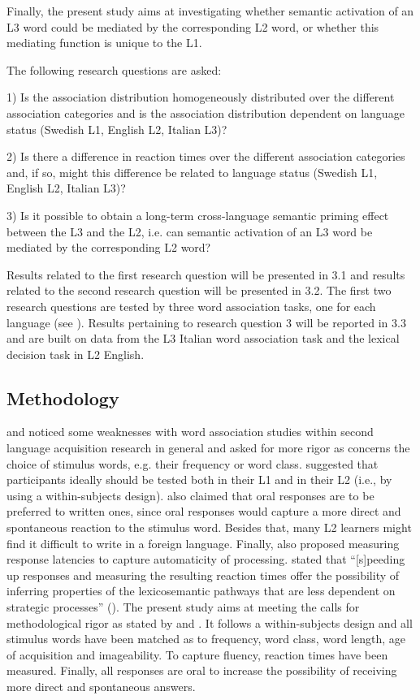 \documentclass[output=paper,colorlinks,citecolor=brown,nonflat]{langsci/langscibook}
\begin{document}
Finally, the present study aims at investigating whether semantic activation of an L3 word could be mediated by the corresponding L2 word, or whether this mediating function is unique to the L1.

The following research questions are asked:

1) Is the association distribution homogeneously distributed over the different association categories and is the association distribution dependent on language status (Swedish L1, English L2, Italian L3)?

2) Is there a difference in reaction times over the different association categories and, if so, might this difference be related to language status (Swedish L1, English L2, Italian L3)?

3) Is it possible to obtain a long-term cross-language semantic priming effect between the L3 and the L2, i.e. can semantic activation of an L3 word be mediated by the corresponding L2 word?

Results related to the first research question will be presented in 3.1 and results related to the second research question will be presented in 3.2. The first two research questions are tested by three word association tasks, one for each language (see ). Results pertaining to research question 3 will be reported in 3.3 and are built on data from the L3 Italian word association task and the lexical decision task in L2 English.

\subsection{Methodology}\label{sec:gudmundson:2.2}

\citet{Fitzpatrick2006} and \citet{FitzpatrickEtAl2013} noticed some weaknesses with word association studies within second language acquisition research in general and asked for more rigor as concerns the choice of stimulus words, e.g. their frequency or word class. \citet[200]{CremerEtAl2010} suggested that participants ideally should be tested both in their L1 and in their L2 (i.e., by using a within-subjects design). \citeauthor{CremerEtAl2010} also claimed that oral responses are to be preferred to written ones, since oral responses would capture a more direct and spontaneous reaction to the stimulus word. Besides that, many L2 learners might find it difficult to write in a foreign language. Finally, \citeauthor{CremerEtAl2010} also proposed measuring response latencies to capture automaticity of processing. \citeauthor{FitzpatrickIzura2011} stated that “[s]peeding up responses and measuring the resulting reaction times offer the possibility of inferring properties of the lexicosemantic pathways that are less dependent on strategic processes” (\citeyear[376]{FitzpatrickIzura2011}). The present study aims at meeting the calls for methodological rigor as stated by \citeauthor{FitzpatrickEtAl2013} and \citeauthor{CremerEtAl2010}. It follows a within-subjects design and all stimulus words have been matched as to frequency, word class, word length, age of acquisition and imageability. To capture fluency, reaction times have been measured. Finally, all responses are oral to increase the possibility of receiving more direct and spontaneous answers.
\end{document}

